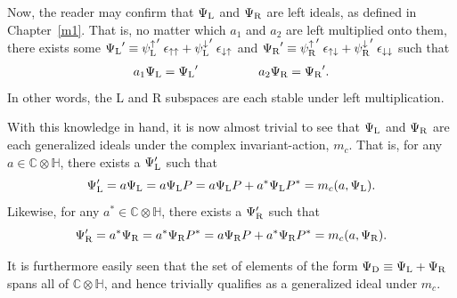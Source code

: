 \documentclass[letterpaper,12pt,titlepage,oneside,final]{book}
\newcommand{\CH}{\mathbb{C}\otimes\mathbb{H}}
\begin{document}
Now, the reader may confirm that $\Psi_{\textup{L}}$ and $\Psi_{\textup{R}}$ are left ideals, as defined in Chapter~\ref{m1}.  That is, no matter which $a_1$ and $a_2$  are left multiplied onto them, there exists some ${\Psi_{\textup{L}}}'  \equiv {\psi^{\uparrow}_{\textup{L}}}' \hspace{1mm} \epsilon_{\uparrow \uparrow} +  {\psi^{\downarrow}_{\textup{L}}}'\hspace{1mm} \epsilon_{\downarrow \uparrow} $ and ${\Psi_{\textup{R}}}'  \equiv {\psi^{\uparrow}_{\textup{R}}}' \hspace{1mm} \epsilon_{\uparrow \downarrow} +  {\psi^{\downarrow}_{\textup{R}}}' \hspace{1mm} \epsilon_{\downarrow \downarrow}$ such that
\begin{equation}\begin{array}{lll}
a_1\Psi_{\textup{L}} = {\Psi_{\textup{L}}}'  &  \hspace{1cm}  &   a_2\Psi_{\textup{R}} = {\Psi_{\textup{R}}}' .
\end{array}\end{equation}
\noindent In other words, the L and R subspaces are each stable under left multiplication.  

With this knowledge in hand, it is now almost trivial to see that $\Psi_{\textup{L}}$ and $\Psi_{\textup{R}}$ are each generalized ideals under the complex invariant-action, $m_c$.  That is, for any $a\in\CH$, there exists a $\Psi_{\textup{L}}'$ such that
\begin{equation}
\Psi_{\textup{L}}' =  a\Psi_{\textup{L}} =  a\Psi_{\textup{L}}P  = a\Psi_{\textup{L}}P + a^*\Psi_{\textup{L}}P^* = m_c(a,\Psi_{\textup{L}} ).
\end{equation}
\noindent Likewise, for any $a^*\in\CH$, there exists a $\Psi_{\textup{R}}'$ such that
\begin{equation}
\Psi_{\textup{R}}' =  a^*\Psi_{\textup{R}} =  a^*\Psi_{\textup{R}}P^*  = a\Psi_{\textup{R}}P + a^*\Psi_{\textup{R}}P^* = m_c(a,\Psi_{\textup{R}} ).
\end{equation}

\noindent It is furthermore easily seen that the set of elements of the form $\Psi_{\textup{D}} \equiv \Psi_{\textup{L}} + \Psi_{\textup{R}}$ spans all of $\CH$, and hence trivially qualifies as a generalized ideal under $m_c$.  

\end{document}
